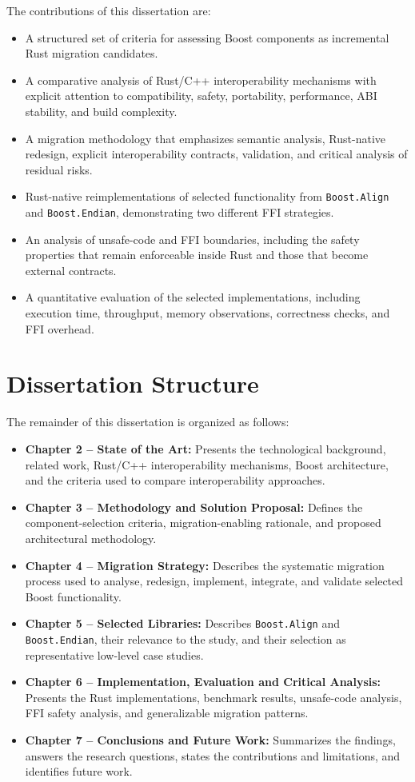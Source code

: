 The contributions of this dissertation are:
\begin{itemize}
    \item A structured set of criteria for assessing Boost components as incremental Rust migration candidates.
    \item A comparative analysis of Rust/C++ interoperability mechanisms with explicit attention to compatibility, safety, portability, performance, ABI stability, and build complexity.
    \item A migration methodology that emphasizes semantic analysis, Rust-native redesign, explicit interoperability contracts, validation, and critical analysis of residual risks.
    \item Rust-native reimplementations of selected functionality from \texttt{Boost.Align} and \texttt{Boost.Endian}, demonstrating two different FFI strategies.
    \item An analysis of unsafe-code and FFI boundaries, including the safety properties that remain enforceable inside Rust and those that become external contracts.
    \item A quantitative evaluation of the selected implementations, including execution time, throughput, memory observations, correctness checks, and FFI overhead.
\end{itemize}

\section{Dissertation Structure}
\label{sec:dissertation_structure}

The remainder of this dissertation is organized as follows:
\begin{itemize}
    \item \textbf{Chapter 2 -- State of the Art:} Presents the technological background, related work, Rust/C++ interoperability mechanisms, Boost architecture, and the criteria used to compare interoperability approaches.
    \item \textbf{Chapter 3 -- Methodology and Solution Proposal:} Defines the component-selection criteria, migration-enabling rationale, and proposed architectural methodology.
    \item \textbf{Chapter 4 -- Migration Strategy:} Describes the systematic migration process used to analyse, redesign, implement, integrate, and validate selected Boost functionality.
    \item \textbf{Chapter 5 -- Selected Libraries:} Describes \texttt{Boost.Align} and \texttt{Boost.Endian}, their relevance to the study, and their selection as representative low-level case studies.
    \item \textbf{Chapter 6 -- Implementation, Evaluation and Critical Analysis:} Presents the Rust implementations, benchmark results, unsafe-code analysis, FFI safety analysis, and generalizable migration patterns.
    \item \textbf{Chapter 7 -- Conclusions and Future Work:} Summarizes the findings, answers the research questions, states the contributions and limitations, and identifies future work.
\end{itemize}

